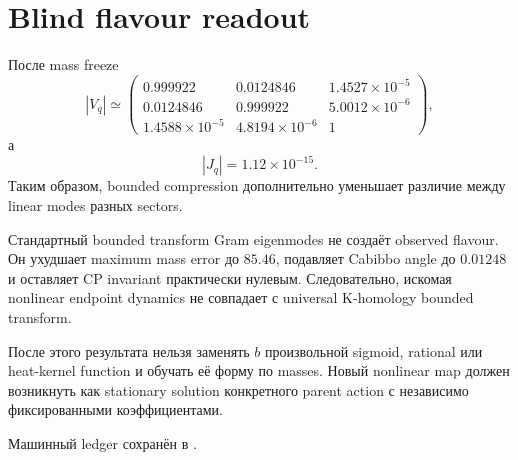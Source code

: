 \section{Blind flavour readout}

После mass freeze
\begin{equation}
 |V_q|\simeq
 \begin{pmatrix}
 0.999922&0.0124846&1.4527\times10^{-5}\\
 0.0124846&0.999922&5.0012\times10^{-6}\\
 1.4588\times10^{-5}&4.8194\times10^{-6}&1
 \end{pmatrix},
\end{equation}
а
\begin{equation}
 |J_q|=1.12\times10^{-15}.
\end{equation}
Таким образом, bounded compression дополнительно уменьшает различие
между linear modes разных sectors.

\begin{theorem}
Стандартный bounded transform Gram eigenmodes не создаёт observed flavour.
Он ухудшает maximum mass error до $85.46$, подавляет Cabibbo angle до
$0.01248$ и оставляет CP invariant практически нулевым. Следовательно,
искомая nonlinear endpoint dynamics не совпадает с universal K-homology
bounded transform.
\end{theorem}

\begin{nogocriterion}
После этого результата нельзя заменять $b$ произвольной sigmoid, rational или
heat-kernel function и обучать её форму по masses. Новый nonlinear map должен
возникнуть как stationary solution конкретного parent action с независимо
фиксированными коэффициентами.
\end{nogocriterion}

Машинный ledger сохранён в
.